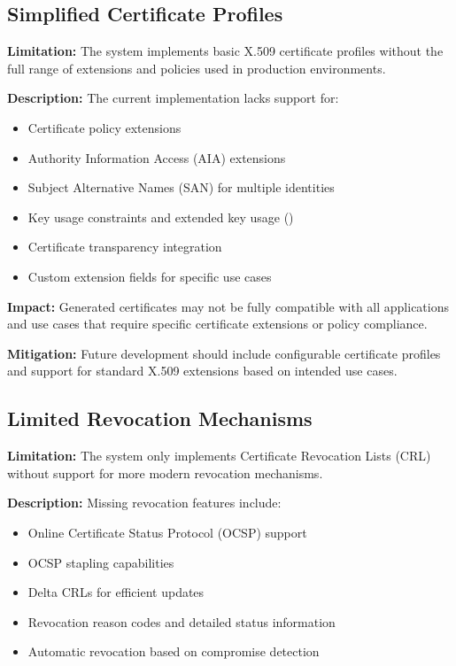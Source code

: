 \subsection{Simplified Certificate Profiles}

\textbf{Limitation:} The system implements basic X.509 certificate profiles without the full range of extensions and policies used in production environments.

\textbf{Description:} The current implementation lacks support for:
\begin{itemize}
    \item Certificate policy extensions
    \item Authority Information Access (AIA) extensions
    \item Subject Alternative Names (SAN) for multiple identities
    \item Key usage constraints and extended key usage ({\color{red}{TODO: Check}})
    \item Certificate transparency integration
    \item Custom extension fields for specific use cases
\end{itemize}

\textbf{Impact:} Generated certificates may not be fully compatible with all applications and use cases that require specific certificate extensions or policy compliance.

\textbf{Mitigation:} Future development should include configurable certificate profiles and support for standard X.509 extensions based on intended use cases.

\subsection{Limited Revocation Mechanisms}

\textbf{Limitation:} The system only implements Certificate Revocation Lists (CRL) without support for more modern revocation mechanisms.

\textbf{Description:} Missing revocation features include:
\begin{itemize}
    \item Online Certificate Status Protocol (OCSP) support
    \item OCSP stapling capabilities
    \item Delta CRLs for efficient updates
    \item Revocation reason codes and detailed status information
    \item Automatic revocation based on compromise detection
\end{itemize}

